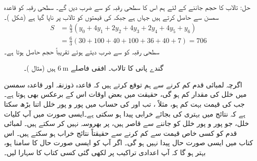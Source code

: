 حل:\quad
تالاب کا حجم جاننے کے لئے ہم اس کا سطحی رقبہ کو  سے ضرب دیں گے۔ سطحی رقبہ کو قاعدہ سمسن سے حاصل کرتے ہیں جہاں  ہے جبکہ  کی قیمتوں کو تالاب پر ناپا گیا ہے (شکل )۔
\begin{align*}
S&=\frac{h}{3}(y_0+4y_1+2y_2+4y_3+2y_4+4y_5+y_6)\\
&=\frac{6}{3}(30+100+40+100+36+40+7)=706
\end{align*}
سطحی رقبہ کو  سے ضرب دیتے ہوئے تقریباً  حجم حاصل ہوتا ہے۔
\begin{figure}
\centering
{}
\caption{گندے پانی کا تالاب۔ افقی فاصلے $\SI{6}{\meter}$ ہیں (مثال )۔}
\label{شکل_مثال_تکمل_گندے_پانی_کا_تالاب}
\end{figure}

اگرچہ لمبائی قدم  کم کرنے سے ہم توقع کرتے ہیں کہ قاعدہ ذوزنقہ اور قاعدہ سمسن میں خلل کی مقدار کم ہو گی، حقیقت میں بعض اوقات اس کے برعکس بھی ہوتا ہے۔جب  کی قیمت بہت کم ہو، مثلاً ، تب  اور  کی حساب میں پور و پور خلل اتنا بڑھ سکتا ہے کہ نتائج میں بہتری کی بجائے خرابی پیدا ہو سکتی ہے۔ایسی صورت میں آپ کلیات خلل، جو پور و پور خلل کو جاننے سے قاصر ہیں، پر بھروسہ نہیں کر سکتے ہیں۔ لمبائی قدم  کو کسی خاص قیمت سے کم کرنے سے حقیقتاً نتائج خراب ہو سکتے ہیں۔ اس کتاب میں ایسی صورت حال پیدا نہیں ہو گی۔ اگر آپ کو ایسی صورت حال کا سامنا ہو، بہتر ہو گا کہ آپ اعدادی تراکیب پر لکھی گئی کسی کتاب کا سہارا لیں۔

